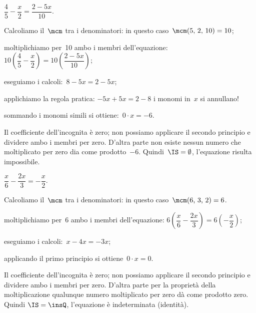 \begin{exrig}\vspace{1.10ex}
 \begin{esempio}
 $\dfrac{4}{5}-\dfrac{x}{2}=\dfrac{2-5x}{10}$.

\begin{enumeratea}
\item Calcoliamo il~$\mcm$ tra i denominatori: in questo
caso~$\mcm(5\text{,~}2\text{,~}10) = 10$;

\item moltiplichiamo per~10 ambo i membri
dell'equazione:
$10\left(\dfrac{4}{5}-\dfrac{x}{2}\right)=10\left(\dfrac{2-5x}{10}\right)$;

\item eseguiamo i calcoli:~$8-5x=2-5x$;

\item applichiamo la regola pratica:
$-5x+5x=2-8$ i monomi in~$x$ si annullano!

\item sommando i monomi simili si ottiene:~$0\cdot x=-6$.
\end{enumeratea}

Il coefficiente dell'incognita è zero; non possiamo
applicare il secondo principio e dividere ambo i membri per zero.
D'altra parte non esiste nessun numero che moltiplicato
per zero dia come prodotto~$-6$. Quindi~$\IS =\emptyset $,
l'equazione risulta impossibile.
 \end{esempio}

 \begin{esempio}
$\dfrac{x}{6}-\dfrac{2x}{3}=-{\dfrac{x}{2}}$.

\begin{enumeratea}
\item Calcoliamo il~$\mcm$ tra i denominatori: in questo
caso~$\mcm(6\text{,~}3\text{,~}2) = 6$.

\item moltiplichiamo per~6 ambo i membri
dell'equazione:
$6\left(\dfrac{x}{6}-\dfrac{2x}{3}\right)=6\left(-{\dfrac{x}{2}}\right)$;

\item eseguiamo i calcoli:~$x-4x=-3x$;

\item applicando il primo principio si ottiene~$0\cdot x=0$.

\end{enumeratea}

Il coefficiente dell'incognita è zero; non possiamo
applicare il secondo principio e dividere ambo i membri per zero.
D'altra parte per la proprietà della moltiplicazione
qualunque numero moltiplicato per zero dà come prodotto zero. Quindi
$\IS = \insQ$, l'equazione è indeterminata (identità).
 \end{esempio}

\end{exrig}\vspace{1.10ex}

